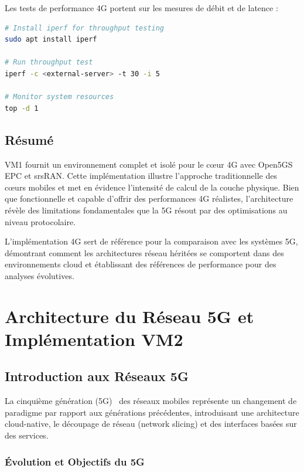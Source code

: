 \documentclass[12pt,a4paper]{report}
\begin{document}
Les tests de performance 4G portent sur les mesures de débit et de latence :

\begin{lstlisting}[caption=Tests de performance 4G, language=bash]
# Install iperf for throughput testing
sudo apt install iperf

# Run throughput test
iperf -c <external-server> -t 30 -i 5

# Monitor system resources
top -d 1
\end{lstlisting}

\section{Résumé}

VM1 fournit un environnement complet et isolé pour le cœur 4G avec Open5GS EPC et srsRAN. Cette implémentation illustre l'approche traditionnelle des cœurs mobiles et met en évidence l'intensité de calcul de la couche physique. Bien que fonctionnelle et capable d'offrir des performances 4G réalistes, l'architecture révèle des limitations fondamentales que la 5G résout par des optimisations au niveau protocolaire.

L'implémentation 4G sert de référence pour la comparaison avec les systèmes 5G, démontrant comment les architectures réseau héritées se comportent dans des environnements cloud et établissant des références de performance pour des analyses évolutives.

\newpage

\chapter{Architecture du Réseau 5G et Implémentation VM2}

\section{Introduction aux Réseaux 5G}

La cinquième génération (5G)~\cite{3gpp-5g,5g-architecture,network-slicing} des réseaux mobiles représente un changement de paradigme par rapport aux générations précédentes, introduisant une architecture cloud-native, le découpage de réseau (network slicing) et des interfaces basées sur des services.



\subsection{Évolution et Objectifs du 5G}
\end{document}
